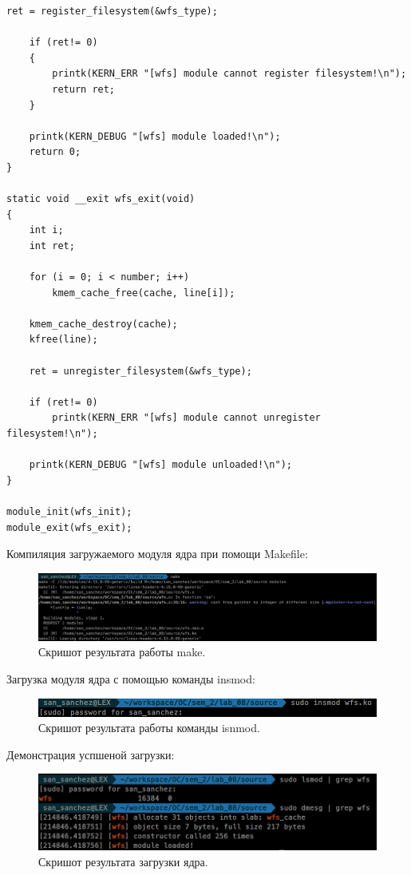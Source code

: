 \begin{lstlisting}[caption=Текст программы]
    ret = register_filesystem(&wfs_type);

    if (ret!= 0)
    {
        printk(KERN_ERR "[wfs] module cannot register filesystem!\n");
        return ret;
    }

    printk(KERN_DEBUG "[wfs] module loaded!\n");
    return 0;
}

static void __exit wfs_exit(void)
{
    int i;
    int ret;

    for (i = 0; i < number; i++)
        kmem_cache_free(cache, line[i]);

    kmem_cache_destroy(cache);
    kfree(line);

    ret = unregister_filesystem(&wfs_type);

    if (ret!= 0)
        printk(KERN_ERR "[wfs] module cannot unregister filesystem!\n");

    printk(KERN_DEBUG "[wfs] module unloaded!\n");
}

module_init(wfs_init);
module_exit(wfs_exit);
\end{lstlisting}


Компиляция загружаемого модуля ядра при помощи Makefile:
\begin{figure}[H]
    \centering
    \includegraphics[scale=0.3]{data/image/make.png}
    \caption{Скришот результата работы make.}
\end{figure}

Загрузка модуля ядра с помощью команды insmod:
\begin{figure}[H]
    \centering
    \includegraphics[scale=0.5]{data/image/2.png}
    \caption{Скришот результата работы команды isnmod.}
\end{figure}

Демонстрация успшеной загрузки:
\begin{figure}[H]
    \centering
    \includegraphics[scale=0.5]{data/image/4.png}
    \caption{Скришот результата загрузки ядра.}
\end{figure}


